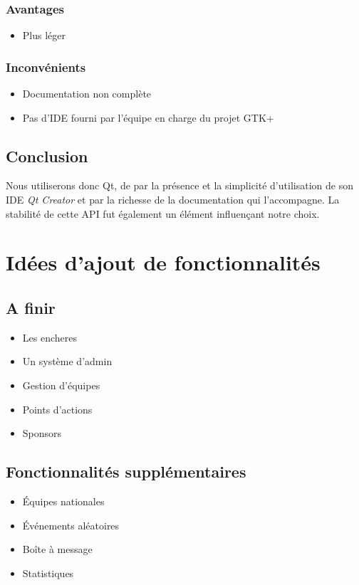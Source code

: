 \documentclass[a4paper]{report}
\begin{document}
\subsection{Avantages}
\begin{itemize}
    \item Plus léger
\end{itemize}
\subsection{Inconvénients}
\begin{itemize}
    \item Documentation non complète
    \item Pas d'IDE fourni par l'équipe en charge du projet GTK+
\end{itemize}
\section{Conclusion}
Nous utiliserons donc Qt, de par la présence et la simplicité d'utilisation de son IDE \textit{Qt Creator} et par la richesse de la documentation qui l'accompagne. La stabilité de cette API fut également un élément influençant notre choix.

\chapter{Idées d'ajout de fonctionnalités}
\section{A finir}
\begin{itemize}
    \item Les \glspl{enchere}
    \item Un système d'admin
    \item Gestion d'équipes
    \item Points d'actions
    \item Sponsors
\end{itemize}
\section {Fonctionnalités supplémentaires}
\begin{itemize}
    \item Équipes nationales
    \item Événements aléatoires
    \item Boîte à message
    \item Statistiques
\end{itemize}



\printindex
\listoffigures
\end{document}
